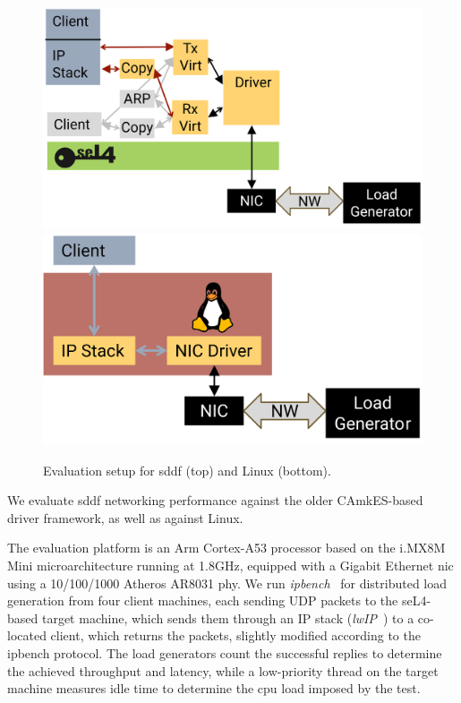 \documentclass[a4paper,12pt]{report}
\newcommand{\figscale}{0.2}
\begin{document}
\begin{figure}[th]
  \centering
  \includegraphics[scale=\figscale]{setup-sddf}
  \vspace{5ex}
  \includegraphics[scale=\figscale]{setup-linux}
  \caption{Evaluation setup for \gls{sddf} (top) and Linux (bottom).}
  \label{f:setup}
\end{figure}

We evaluate \gls{sddf} networking performance against the older CAmkES-based driver
framework, as well as against Linux.

The evaluation platform is an Arm Cortex-A53 processor based on the
i.MX8M Mini microarchitecture running at 1.8GHz, equipped with a
Gigabit Ethernet \gls{nic} using a 10/100/1000 Atheros AR8031 \gls{phy}. We run
\emph{ipbench}~\citep{Wienand_Macpherson_04} for distributed load
generation from four client machines, each sending UDP packets to the
seL4-based target machine, which sends them through an IP stack
(\emph{lwIP}~\citep{Dunkels_01}) to a co-located client, which
returns the packets, slightly modified according to the ipbench protocol.
The load generators count the successful
replies to determine the achieved throughput and latency, while a
low-priority thread on the target machine measures idle time to
determine the \gls{cpu} load imposed by the test.
\end{document}
